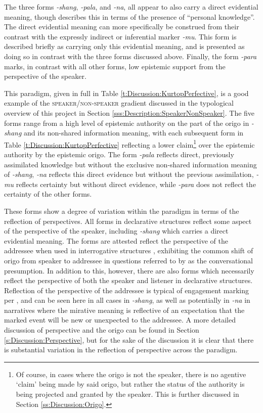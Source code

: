 The three forms \textit{-shang}, \textit{-pala}, and \textit{-na}, all appear to also carry a direct evidential meaning, though  describes this in terms of the presence of ``personal knowledge''. The direct evidential meaning can more specifically be construed from their contrast with the expressly indirect or inferential marker \textit{-mu}. This form is described briefly as carrying only this evidential meaning, and is presented as doing so in contrast with the three forms discussed above. Finally, the form \textit{-para} marks, in contrast with all other forms, low epistemic support from the perspective of the speaker.

This paradigm, given in full in Table \ref{t:Discussion:KurtopPerfective}, is a good example of the \textsc{speaker/non-speaker} gradient discussed in the typological overview of this project in Section \ref{sss:Description:SpeakerNonSpeaker}. The five forms range from a high level of epistemic authority on the part of the origo in \textit{-shang} and its non-shared information meaning, with each subsequent form in Table \ref{t:Discussion:KurtopPerfective} reflecting a lower claim\footnote{Of course, in cases where the origo is not the speaker, there is no agentive `claim' being made by said origo, but rather the status of the authority is being projected and granted by the speaker. This is further discussed in Section \ref{ss:Discussion:Origo}.} over the epistemic authority by the epistemic origo. The form \textit{-pala} reflects direct, previously assimilated knowledge but without the exclusive non-shared information meaning of \textit{-shang}, \textit{-na} reflects this direct evidence but without the previous assimilation, \textit{-mu} reflects certainty but without direct evidence, while \textit{-para} does not reflect the certainty of the other forms.

These forms show a degree of variation within the paradigm in terms of the reflection of perspectives. All forms in declarative structures reflect some aspect of the perspective of the speaker, including \textit{-shang} which carries a direct evidential meaning. The forms are attested reflect the perspective of the addressee when used in interrogative structures \cite{Hyslop2018}, exhibiting the common shift of origo from speaker to addressee in questions referred to by  as the conversational presumption. In addition to this, however, there are also forms which necessarily reflect the perspective of both the speaker and listener in declarative structures. Reflection of the perspective of the addressee is typical of engagement marking per , and can be seen here in all cases in \textit{-shang}, as well as potentially in \textit{-na} in narratives where the mirative meaning is reflective of an expectation that the marked event will be new or unexpected to the addressee. A more detailed discussion of perspective and the origo can be found in Section \ref{s:Discussion:Perspective}, but for the sake of the discussion it is clear that there is substantial variation in the reflection of perspective across the paradigm.

